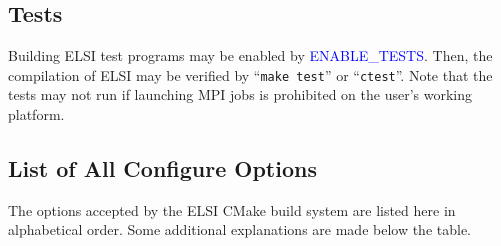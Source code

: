 \documentclass{report}
\begin{document}
\subsection{Tests}
\label{subsec:config_tests}
Building ELSI test programs may be enabled by \textcolor{blue}{ENABLE\_TESTS}. Then, the compilation of ELSI may be verified by ``\verb+make test+'' or ``\verb+ctest+''. Note that the tests may not run if launching MPI jobs is prohibited on the user's working platform.

\subsection{List of All Configure Options}
\label{subsec:config_options}
The options accepted by the ELSI CMake build system are listed here in alphabetical order. Some additional explanations are made below the table.
\end{document}
